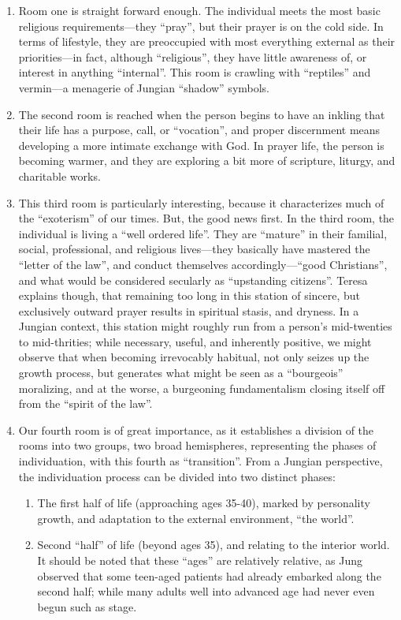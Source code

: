 \begin{enumerate}


\item Room one is straight forward enough. The individual meets the most basic religious requirements---they ``pray'', but their prayer is on the cold side. In terms of lifestyle, they are preoccupied with most everything external as their priorities---in fact, although ``religious'', they have little awareness of, or interest in anything ``internal''. This room is crawling with ``reptiles'' and vermin---a menagerie of Jungian ``shadow'' symbols.

\item The second room is reached when the person begins to have an inkling that their life has a purpose, call, or ``vocation'', and proper discernment means developing a more intimate exchange with God. In prayer life, the person is becoming warmer, and they are exploring a bit more of scripture, liturgy, and charitable works.

\item This third room is particularly interesting, because it characterizes much of the ``exoterism'' of our times. But, the good news first. In the third room, the individual is living a ``well ordered life''. They are ``mature'' in their familial, social, professional, and religious lives---they basically have mastered the ``letter of the law'', and conduct themselves accordingly---``good Christians'', and what would be considered secularly as ``upstanding citizens''. Teresa explains though, that remaining too long in this station of sincere, but exclusively outward prayer results in spiritual stasis, and dryness. In a Jungian context, this station might roughly run from a person's mid-twenties to mid-thrities; while necessary, useful, and inherently positive, we might observe that when becoming irrevocably habitual, not only seizes up the growth process, but generates what might be seen as a ``bourgeois'' moralizing, and at the worse, a burgeoning fundamentalism closing itself off from the ``spirit of the law''.

\item Our fourth room is of great importance, as it establishes a division of the rooms into two groups, two broad hemispheres, representing the phases of individuation, with this fourth as ``transition''. From a Jungian perspective, the individuation process can be divided into two distinct phases:

\begin{enumerate}
  
\item The first half of life (approaching ages 35-40), marked by personality growth, and adaptation to the external environment, ``the world''.
  
\item Second ``half'' of life (beyond ages 35), and relating to the interior world.~ It should be noted that these ``ages'' are relatively relative, as Jung observed that some teen-aged patients had already embarked along the second half; while many adults well into advanced age had never even begun such as stage.
\end{enumerate}
\end{enumerate}


